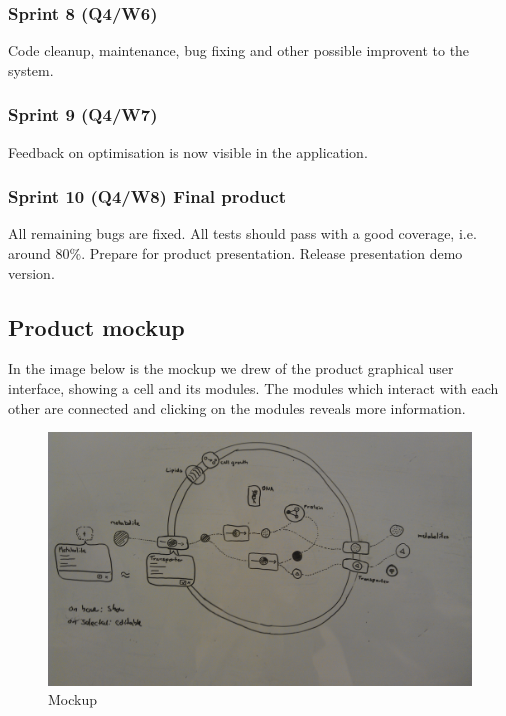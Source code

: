 \documentclass[10pt,a4paper]{report}
\begin{document}
			\subsubsection*{Sprint 8 (Q4/W6)}
				Code cleanup, maintenance, bug fixing and other possible improvent to the system.
			\subsubsection*{Sprint 9 (Q4/W7)}
				Feedback on optimisation is now visible in the application. 
			\subsubsection*{Sprint 10 (Q4/W8) Final product}
				All remaining bugs are fixed. All tests should pass with a good coverage, i.e. around 80\%. Prepare for product presentation. Release presentation demo version.

	\clearpage

	\subsection{Product mockup}
		In the image below is the mockup we drew of the product graphical user interface, showing a cell and its modules. The modules which interact with each other are connected and clicking on the modules reveals more information.
		\begin{figure}[htb]
			\centerline{\includegraphics[scale=0.15]{mockup.jpg}}
			\caption{Mockup}
			\label{fig: Mockup}
		\end{figure}	
\end{document}
